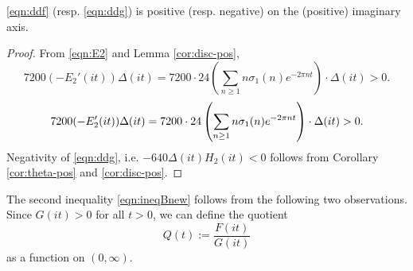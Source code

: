 \begin{corollary}\label{cor:MLDE-pos}\leanok
\eqref{eqn:ddf} (resp. \eqref{eqn:ddg}) is positive (resp. negative) on the (positive) imaginary axis.
\end{corollary}
\begin{proof}\leanok
From \eqref{eqn:E2} and Lemma \ref{cor:disc-pos},
\ifplastex
\begin{equation*}
    7200 (-E_2'(it)) \Delta(it) = 7200 \cdot 24 \left(\sum_{n \ge 1} n \sigma_1(n) e^{-2 \pi n t}\right) \cdot \Delta(it) > 0.
\end{equation*}
\else
\begin{equation}
    7200 (-E_2'(it)) \Delta(it) = 7200 \cdot 24 \left(\sum_{n \ge 1} n \sigma_1(n) e^{-2 \pi n t}\right) \cdot \Delta(it) > 0. \notag
\end{equation}
\fi
Negativity of \eqref{eqn:ddg}, i.e. $-640 \Delta(it) H_2(it) < 0$ follows from Corollary \ref{cor:theta-pos} and \ref{cor:disc-pos}.
\end{proof}


The second inequality \eqref{eqn:ineqBnew} follows from the following two observations.
Since $G(it) > 0$ for all $t > 0$, we can define the quotient
\begin{equation}\label{eqn:Q}
    Q(t) := \frac{F(it)}{G(it)}
\end{equation}
as a function on $(0, \infty)$.


